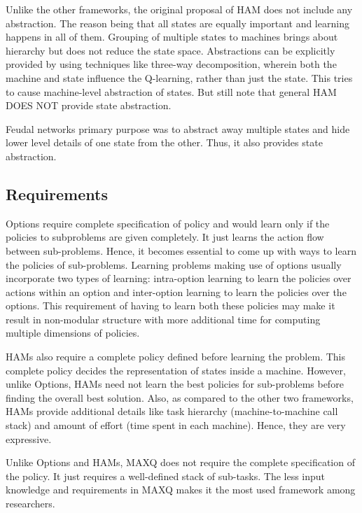 Unlike the other frameworks, the original proposal of HAM does not include any abstraction. The reason being that all states are equally important and learning happens in all of them. Grouping of multiple states to machines brings about hierarchy but does not reduce the state space. Abstractions can be explicitly provided by using techniques like three-way decomposition, wherein both the machine and state influence the Q-learning, rather than just the state. This tries to cause machine-level abstraction of states. But still note that general HAM DOES NOT provide state abstraction. 

Feudal networks primary purpose was to abstract away multiple states and hide lower level details of one state from the other. Thus, it also provides state abstraction. 

\subsection{Requirements}

Options require complete specification of policy and would learn only if the policies to subproblems are given completely. It just learns the action flow between sub-problems. Hence, it becomes essential to come up with ways to learn the policies of sub-problems. Learning problems making use of options usually incorporate two types of learning: intra-option learning to learn the policies over actions within an option and inter-option learning to learn the policies over the options. This requirement of having to learn both these policies may make it result in non-modular structure with more additional time for computing multiple dimensions of policies. 

HAMs also require a complete policy defined before learning the problem. This complete policy decides the representation of states inside a machine. However, unlike Options, HAMs need not learn the best policies for sub-problems before finding the overall best solution. Also, as compared to the other two frameworks, HAMs provide additional details like task hierarchy (machine-to-machine call stack) and amount of effort (time spent in each machine). Hence, they are very expressive. 

Unlike Options and HAMs, MAXQ does not require the complete specification of the policy. It just requires a well-defined stack of sub-tasks. The less input knowledge and requirements in MAXQ makes it the most used framework among researchers.

